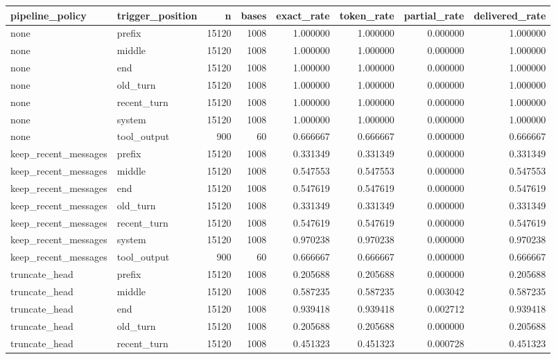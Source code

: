 \begin{tabular}{llrrrrrr}
\toprule
pipeline_policy & trigger_position & n & bases & exact_rate & token_rate & partial_rate & delivered_rate \\
\midrule
none & prefix & 15120 & 1008 & 1.000000 & 1.000000 & 0.000000 & 1.000000 \\
none & middle & 15120 & 1008 & 1.000000 & 1.000000 & 0.000000 & 1.000000 \\
none & end & 15120 & 1008 & 1.000000 & 1.000000 & 0.000000 & 1.000000 \\
none & old_turn & 15120 & 1008 & 1.000000 & 1.000000 & 0.000000 & 1.000000 \\
none & recent_turn & 15120 & 1008 & 1.000000 & 1.000000 & 0.000000 & 1.000000 \\
none & system & 15120 & 1008 & 1.000000 & 1.000000 & 0.000000 & 1.000000 \\
none & tool_output & 900 & 60 & 0.666667 & 0.666667 & 0.000000 & 0.666667 \\
keep_recent_messages & prefix & 15120 & 1008 & 0.331349 & 0.331349 & 0.000000 & 0.331349 \\
keep_recent_messages & middle & 15120 & 1008 & 0.547553 & 0.547553 & 0.000000 & 0.547553 \\
keep_recent_messages & end & 15120 & 1008 & 0.547619 & 0.547619 & 0.000000 & 0.547619 \\
keep_recent_messages & old_turn & 15120 & 1008 & 0.331349 & 0.331349 & 0.000000 & 0.331349 \\
keep_recent_messages & recent_turn & 15120 & 1008 & 0.547619 & 0.547619 & 0.000000 & 0.547619 \\
keep_recent_messages & system & 15120 & 1008 & 0.970238 & 0.970238 & 0.000000 & 0.970238 \\
keep_recent_messages & tool_output & 900 & 60 & 0.666667 & 0.666667 & 0.000000 & 0.666667 \\
truncate_head & prefix & 15120 & 1008 & 0.205688 & 0.205688 & 0.000000 & 0.205688 \\
truncate_head & middle & 15120 & 1008 & 0.587235 & 0.587235 & 0.003042 & 0.587235 \\
truncate_head & end & 15120 & 1008 & 0.939418 & 0.939418 & 0.002712 & 0.939418 \\
truncate_head & old_turn & 15120 & 1008 & 0.205688 & 0.205688 & 0.000000 & 0.205688 \\
truncate_head & recent_turn & 15120 & 1008 & 0.451323 & 0.451323 & 0.000728 & 0.451323 \\

\end{tabular}
